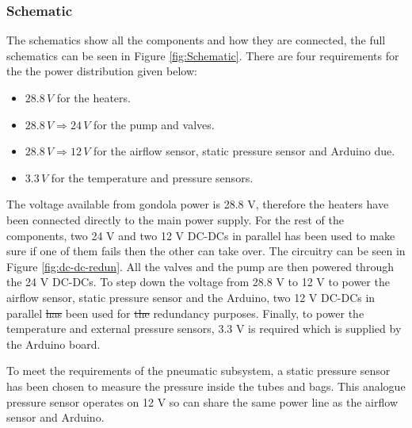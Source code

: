 \documentclass[a4paper,12pt,oneside]{article} %
\providecommand{\DIFaddtex}[1]{{\protect\color{blue}\uwave{#1}}} %
\providecommand{\DIFdeltex}[1]{{\protect\color{red}\sout{#1}}}                      %
\providecommand{\DIFaddbegin}{} %
\providecommand{\DIFaddend}{} %
\providecommand{\DIFdelbegin}{} %
\providecommand{\DIFdelend}{} %
\providecommand{\DIFadd}[1]{\texorpdfstring{\DIFaddtex{#1}}{#1}} %
\providecommand{\DIFdel}[1]{\texorpdfstring{\DIFdeltex{#1}}{}} %
\newcommand{\DIFscaledelfig}{0.5}
\newlength{\DIFdelgraphicswidth} %
\newlength{\DIFdelgraphicsheight} %
\newcommand{\DIFaddincludegraphics}[2][]{{\color{blue}\fbox{\DIFOincludegraphics[#1]{#2}}}} %
\newcommand{\DIFdelincludegraphics}[2][]{%
\sbox{\DIFdelgraphicsbox}{\DIFOincludegraphics[#1]{#2}}%
\settoboxwidth{\DIFdelgraphicswidth}{\DIFdelgraphicsbox} %
\settoboxtotalheight{\DIFdelgraphicsheight}{\DIFdelgraphicsbox} %
\scalebox{\DIFscaledelfig}{%
\parbox[b]{\DIFdelgraphicswidth}{\usebox{\DIFdelgraphicsbox}\\[-\baselineskip] \rule{\DIFdelgraphicswidth}{0em}}\llap{\resizebox{\DIFdelgraphicswidth}{\DIFdelgraphicsheight}{%
\setlength{\unitlength}{\DIFdelgraphicswidth}%
\begin{picture}(1,1)%
\thicklines\linethickness{2pt} %
{\color[rgb]{1,0,0}\put(0,0){\framebox(1,1){}}}%
{\color[rgb]{1,0,0}\put(0,0){\line( 1,1){1}}}%
{\color[rgb]{1,0,0}\put(0,1){\line(1,-1){1}}}%
\end{picture}%
}\hspace*{3pt}}} %
} %
\DeclareRobustCommand{\DIFaddbegin}{\DIFOaddbegin \let\includegraphics\DIFaddincludegraphics} %
\DeclareRobustCommand{\DIFaddend}{\DIFOaddend \let\includegraphics\DIFOincludegraphics} %
\DeclareRobustCommand{\DIFdelbegin}{\DIFOdelbegin \let\includegraphics\DIFdelincludegraphics} %
\DeclareRobustCommand{\DIFdelend}{\DIFOaddend \let\includegraphics\DIFOincludegraphics} %
\begin{document}
\subsubsection{Schematic}

The schematics show all the components and how they are connected, the full schematics can be seen in Figure \ref{fig:Schematic}. There are four requirements for the the power distribution given below:

\begin{itemize}

    \item $28.8 \, V$ for the heaters.  

    \item $28.8 \, V \Longrightarrow 24 \, V$ for the pump and valves.

    \item $28.8 \, V \Longrightarrow 12 \, V$ for the airflow sensor, static pressure sensor and Arduino due.

    \item $3.3 \, V$ for the temperature and pressure sensors. 

\end{itemize}

The voltage available from gondola power is 28.8 V, therefore the heaters have been connected directly to the main power supply. For the rest of the components, two 24 V and two 12 V DC-DCs in parallel has been used to make sure if one of them fails then the other can take over. The circuitry can be seen in Figure \ref{fig:dc-dc-redun}. All the valves and the pump are then powered through the 24 V DC-DCs. To step down the voltage from 28.8 V to 12 V to power the airflow sensor, static pressure sensor and the Arduino, two 12 V DC-DCs in parallel \DIFdelbegin \DIFdel{has }\DIFdelend \DIFaddbegin \DIFadd{have }\DIFaddend been used for \DIFdelbegin \DIFdel{the }\DIFdelend redundancy purposes. Finally, to power the temperature and external pressure sensors, 3.3 V is required which is supplied by the Arduino board. 

To meet the requirements of the pneumatic subsystem, a static pressure sensor has been chosen to measure the pressure inside the tubes and bags. This analogue pressure sensor operates on 12 V so can share the same power line as the airflow sensor and Arduino.
\end{document}
